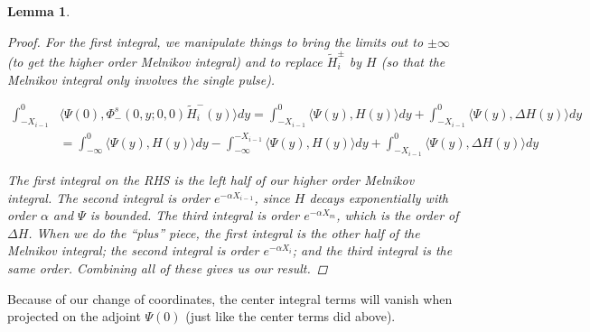 \documentclass[12pt]{article}
\newtheorem{lemma}{Lemma}
\begin{document}
\begin{lemma}
\begin{proof}
For the first integral, we manipulate things to bring the limits out to $\pm \infty$ (to get the higher order Melnikov integral) and to replace $\tilde{H}_i^\pm$ by $H$ (so that the Melnikov integral only involves the single pulse).

\begin{align*}
\int_{-X_{i-1}}^0 &\langle \Psi(0), \Phi^s_-(0, y; 0, 0) \tilde{H}_i^-(y) \rangle dy = 
\int_{-X_{i-1}}^0 \langle \Psi(y), H(y) \rangle dy + \int_{-X_{i-1}}^0 \langle \Psi(y), \Delta H(y) \rangle dy \\
&= \int_{-\infty}^0 \langle \Psi(y), H(y) \rangle dy - \int_{-\infty}^{-X_{i-1}} \langle \Psi(y), H(y) \rangle dy + \int_{-X_{i-1}}^0 \langle \Psi(y), \Delta H(y) \rangle dy 
\end{align*}

The first integral on the RHS is the left half of our higher order Melnikov integral. The second integral is order $e^{-\alpha X_{i-1}}$, since $H$ decays exponentially with order $\alpha$ and $\Psi$ is bounded. The third integral is order $e^{-\alpha X_m}$, which is the order of $\Delta H$. When we do the ``plus'' piece, the first integral is the other half of the Melnikov integral; the second integral is order $e^{-\alpha X_i}$; and the third integral is the same order. Combining all of these gives us our result.

\end{proof}
\end{lemma}

Because of our change of coordinates, the center integral terms will vanish when projected on the adjoint $\Psi(0)$ (just like the center terms did above).




\end{document}
